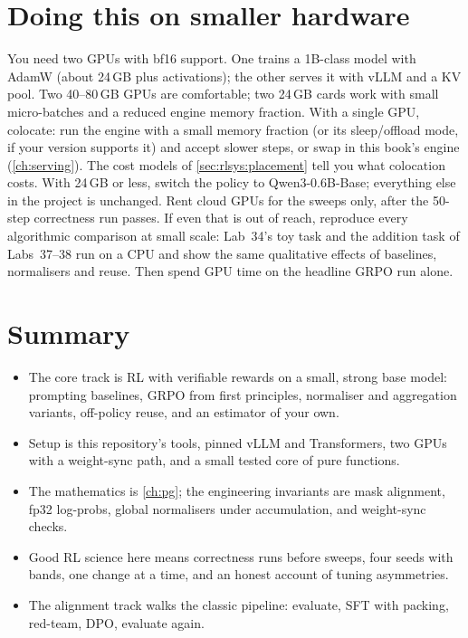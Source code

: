 \section{Doing this on smaller hardware}\label{sec:proj5:outside}

You need two GPUs with bf16 support. One trains a 1B-class model with AdamW (about 24\,GB plus
activations); the other serves it with vLLM and a KV pool. Two 40--80\,GB GPUs are comfortable; two
24\,GB cards work with small micro-batches and a reduced engine memory fraction. With a single GPU,
colocate: run the engine with a small memory fraction (or its sleep/offload mode, if your version
supports it) and accept slower steps, or swap in this book's engine (\cref{ch:serving}). The cost
models of \cref{sec:rlsys:placement} tell you what colocation costs. With 24\,GB or less, switch the policy
to Qwen3-0.6B-Base; everything else in the project is unchanged. Rent cloud GPUs for the sweeps only,
after the 50-step correctness run passes. If even that is out of reach, reproduce every algorithmic
comparison at small scale: Lab~34's toy task and the addition task of Labs~37--38 run on a CPU and show
the same qualitative effects of baselines, normalisers and reuse. Then spend GPU time on the headline
GRPO run alone.

\section{Summary}
\begin{itemize}
\item The core track is RL with verifiable rewards on a small, strong base model: prompting baselines,
  GRPO from first principles, normaliser and aggregation variants, off-policy reuse, and an estimator of
  your own.
\item Setup is this repository's  tools, pinned vLLM and Transformers, two GPUs
  with a weight-sync path, and a small tested core of pure functions.
\item The mathematics is \cref{ch:pg}; the engineering invariants are mask alignment, fp32 log-probs,
  global normalisers under accumulation, and weight-sync checks.
\item Good RL science here means correctness runs before sweeps, four seeds with bands, one change at a
  time, and an honest account of tuning asymmetries.
\item The alignment track walks the classic pipeline: evaluate, SFT with packing, red-team, DPO,
  evaluate again.
\end{itemize}

